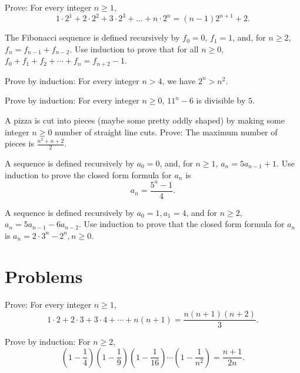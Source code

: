 \begin{exer} 
 Prove: For every integer $n\geq 1$, 
\[
1\cdot 2^1+2\cdot 2^2+3\cdot 2^3+...+n\cdot 2^n=(n-1)2^{n+1}+2.
\]
\end{exer}

\begin{exer} 
The Fibonacci sequence is defined recursively by $f_{0}= 0$, $f_{1}=1$, and, for $n\geq 2$, $f_{n}= f_{n-1}+f_{n-2}$.
Use induction to prove that for all $n\geq 0$, $f_{0}+ f_{1} + f_{2}+\cdots+f_{n} = f_{n+2} - 1$.
\end{exer}

\begin{exer} 
Prove by induction: For every integer $n>4$, we have $2^n>n^2$.
\end{exer}

\begin{exer} 
Prove by induction: For every integer $n\geq 0$, $11^{n} - 6$ is divisible by $5$.
\end{exer}

\begin{exer} 
A pizza is cut into pieces (maybe some pretty oddly shaped) by making
some integer $n\geq 0$ number of straight line cuts. Prove: The maximum number of pieces 
is $\displaystyle \frac{n^2+n+2}{2}$. 
\end{exer}

\begin{exer} 
A sequence is defined recursively by $a_0=0$, and, for $n\geq 1$, $a_n = 5a_{n-1}+1$.
Use induction to prove the closed form formula for $a_n$ is 
\[
 a_n = \frac{5^n-1}{4}.
\]
\end{exer}

\begin{exer} 
A sequence is defined recursively by $a_0=1, a_1=4$, and for $n\geq 2$, $a_n=5a_{n-1}-6a_{n-2}$.
Use induction to prove that the closed form formula for $a_n$ is $ \displaystyle a_n=2\cdot 3^n - 2^n, n\geq 0$.
\end{exer}


\clearpage
\section{Problems}

\begin{prob}
Prove: For every integer $n\geq 1$,
\[
1\cdot 2+ 2\cdot 3+3\cdot4+\cdots+n(n+1) = \frac{n(n+1)(n+2)}{3}.
\]
\end{prob}

\begin{prob}
Prove by induction:  For $n\geq 2$,
\[
\displaystyle \left( 1 - \frac{1}{4}\right) \left( 1 - \frac{1}{9}\right)\left( 1 - \frac{1}{16}\right)
\cdots \left( 1 - \frac{1}{n^{2}}\right) = \frac{n+1}{2n}.
\]
\end{prob}

